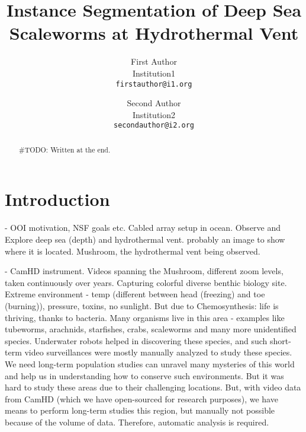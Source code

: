 \documentclass[10pt,twocolumn,letterpaper]{article}
\begin{document}
\title{Instance Segmentation of Deep Sea Scaleworms at Hydrothermal Vent}

\author{First Author \\
Institution1\\
{\tt\small firstauthor@i1.org}
\and
Second Author \\
Institution2\\
{\tt\small secondauthor@i2.org}
}

\maketitle
\ifwacvfinal\thispagestyle{empty}\fi

\begin{abstract}
   #TODO: Written at the end.
\end{abstract}

\section{Introduction}

- OOI motivation, NSF goals etc. Cabled array setup in ocean. Observe and Explore deep sea (depth) and hydrothermal vent. probably an image to show where it is located. Mushroom, the hydrothermal vent being observed.

- CamHD instrument. Videos spanning the Mushroom, different zoom levels, taken continuously over years. Capturing colorful diverse benthic biology site. Extreme environment - temp (different between head (freezing) and toe (burning)), pressure, toxins, no sunlight. But due to Chemosynthesis: life is thriving, thanks to bacteria. Many organisms live in this area - examples like tubeworms, arachnids, starfishes, crabs, scaleworms and many more unidentified species. Underwater robots helped in discovering these species, and such short-term video surveillances were mostly manually analyzed to study these species. We need long-term population studies can unravel many mysteries of this world and help us in understanding how to conserve such environments. But it was hard to study these areas due to their challenging locations. But, with video data from CamHD (which we have open-sourced for research purposes), we have means to perform long-term studies this region, but manually not possible because of the volume of data. Therefore, automatic analysis is required.
\end{document}
